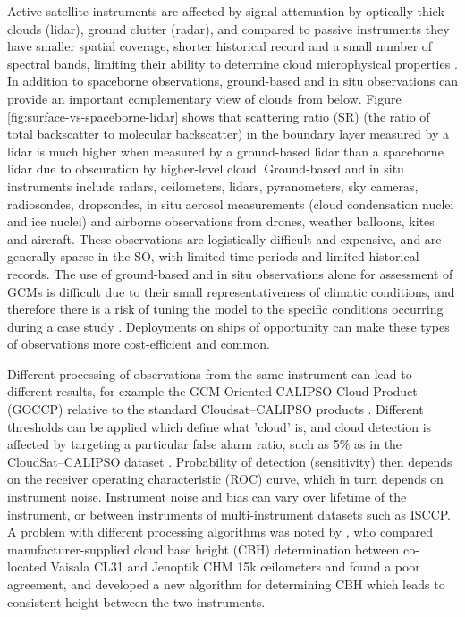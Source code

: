 Active satellite instruments are affected by signal attenuation by
optically thick
clouds (lidar), ground clutter (radar), and compared to passive instruments they have smaller spatial coverage,
shorter historical record and a small number of spectral bands, limiting their
ability to determine cloud microphysical properties \citep{noh2017,mace2018a,mace2018b,gettelman2020}.
In addition to spaceborne observations, ground-based and in situ
observations can provide an important complementary view of clouds from below.
Figure \ref{fig:surface-vs-spaceborne-lidar} shows that scattering ratio (SR)
(the ratio of total backscatter to molecular backscatter)
in the boundary layer measured by a lidar is much higher when measured by 
a ground-based lidar than a spaceborne lidar due to obscuration by higher-level
cloud.
Ground-based and in situ instruments include radars, ceilometers, lidars,
pyranometers, sky cameras, radiosondes, dropsondes, in situ aerosol measurements
(cloud condensation nuclei and ice nuclei) and airborne observations from
drones, weather balloons, kites and aircraft. These observations are logistically
difficult and expensive, and are generally sparse in the SO, with
limited time periods and limited historical records. The use of ground-based and
in situ observations alone for assessment of GCMs is difficult due to their
small representativeness of climatic conditions, and therefore there
is a risk of tuning the model to the specific conditions occurring during a
case study \citep{jakob2003}. Deployments on ships of opportunity can make these types
of observations more cost-efficient and common.

Different processing of observations from the same instrument can lead
to different results, for example the
GCM-Oriented CALIPSO Cloud Product (GOCCP) relative to the standard
Cloudsat--CALIPSO products \citep{chepfer2010}.
Different thresholds can be applied which define what 'cloud' is,
and cloud detection is affected by targeting a particular false alarm ratio,
such as 5\% as in the CloudSat--CALIPSO dataset \citep{hagihara2010}.
Probability of detection (sensitivity) then depends on the receiver operating
characteristic (ROC) curve, which in turn depends on instrument
noise. Instrument noise and bias can vary over lifetime of the instrument,
or between instruments of multi-instrument datasets such as ISCCP.
A problem with different processing
algorithms was noted by \cite{martucci2010}, who compared
manufacturer-supplied cloud base height (CBH)
determination between co-located Vaisala CL31 and Jenoptik CHM 15k ceilometers
and found a poor agreement, and developed a new algorithm for determining
CBH which leads to consistent height between the two instruments.

